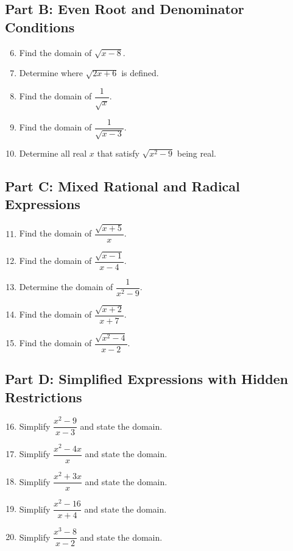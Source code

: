 \documentclass[12pt]{article}
\begin{document}
\subsection*{Part B: Even Root and Denominator Conditions}
\begin{enumerate}
  \setcounter{enumi}{5}
  \item Find the domain of \(\sqrt{x - 8}\).
  \item Determine where \(\sqrt{2x + 6}\) is defined.
  \item Find the domain of \(\dfrac{1}{\sqrt{x}}\).
  \item Find the domain of \(\dfrac{1}{\sqrt{x - 3}}\).
  \item Determine all real \(x\) that satisfy \(\sqrt{x^2 - 9}\) being real.
\end{enumerate}

\subsection*{Part C: Mixed Rational and Radical Expressions}
\begin{enumerate}
  \setcounter{enumi}{10}
  \item Find the domain of \(\dfrac{\sqrt{x + 5}}{x}\).
  \item Find the domain of \(\dfrac{\sqrt{x - 1}}{x - 4}\).
  \item Determine the domain of \(\dfrac{1}{x^2 - 9}\).
  \item Find the domain of \(\dfrac{\sqrt{x + 2}}{x + 7}\).
  \item Find the domain of \(\dfrac{\sqrt{x^2 - 4}}{x - 2}\).
\end{enumerate}

\subsection*{Part D: Simplified Expressions with Hidden Restrictions}
\begin{enumerate}
  \setcounter{enumi}{15}
  \item Simplify \(\dfrac{x^2 - 9}{x - 3}\) and state the domain.
  \item Simplify \(\dfrac{x^2 - 4x}{x}\) and state the domain.
  \item Simplify \(\dfrac{x^2 + 3x}{x}\) and state the domain.
  \item Simplify \(\dfrac{x^2 - 16}{x + 4}\) and state the domain.
  \item Simplify \(\dfrac{x^3 - 8}{x - 2}\) and state the domain.
\end{enumerate}
\end{document}
